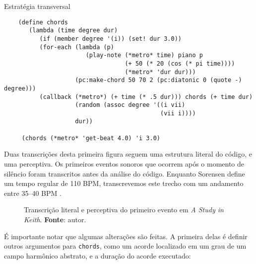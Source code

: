 \begin{example}{Estratégia transversal}
\begin{verbatim}
    (define chords
       (lambda (time degree dur)
          (if (member degree '(i)) (set! dur 3.0))
          (for-each (lambda (p)
                       (play-note (*metro* time) piano p
                                  (+ 50 (* 20 (cos (* pi time))))
                                  (*metro* 'dur dur)))
                    (pc:make-chord 50 70 2 (pc:diatonic 0 (quote -) degree)))
          (callback (*metro*) (+ time (* .5 dur))) chords (+ time dur)
                    (random (assoc degree '((i vii)
                                            (vii i))))
                    dur))
    
     (chords (*metro* 'get-beat 4.0) 'i 3.0)
\end{verbatim}
\end{example}

Duas transcrições desta primeira figura seguem uma estrutura literal do código, e uma perceptiva. Os primeiros eventos sonoros que ocorrem após o momento de silêncio foram transcritos antes da análise do código. Enquanto Sorensen define um tempo regular de 110 BPM, transcrevemos este trecho com um andamento entre 35--40 BPM . %

\begin{figure}[!h]
  \centering
  \centering 
  
  
  \caption{Transcrição literal e perceptiva do primeiro evento em \emph{A Study in Keith}. \textbf{Fonte}: autor.}
  \label{fig:ask1}
\end{figure}

 É importante notar que algumas alterações são feitas. A primeira delas é definir outros argumentos para \verb|chords|, como um acorde localizado em um grau de um campo harmônico abstrato, e a duração do acorde executado:

